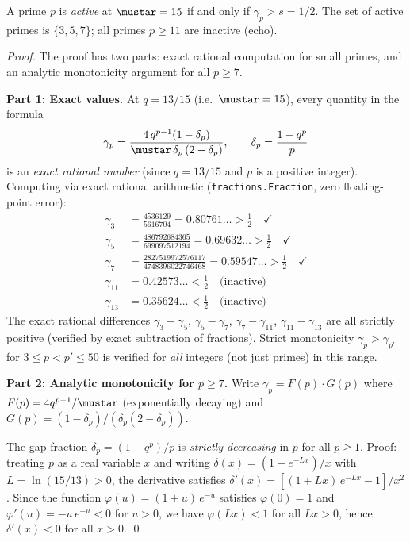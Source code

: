 \documentclass[12pt,a4paper]{article}
\begin{document}
\mTHM
\begin{theorem}
\label{thm:active}
A prime $p$ is \emph{active} at $\mustar = 15$ if and only if
$\gamma_p > s = 1/2$. The set of active primes is $\{3, 5, 7\}$;
all primes $p \geq 11$ are inactive (echo).

\begin{proof}
The proof has two parts: exact rational computation for small primes,
and an analytic monotonicity argument for all $p \geq 7$.

\medskip\noindent\textbf{Part 1: Exact values.}
At $q = 13/15$ (i.e.\ $\mustar = 15$), every quantity in the formula
\begin{equation}
  \gamma_p = \frac{4\,q^{p-1}(1 - \delta_p)}{\mustar\,\delta_p\,(2 - \delta_p)},
  \qquad \delta_p = \frac{1 - q^p}{p}
  \label{eq:gamma_explicit}
\end{equation}
is an \emph{exact rational number} (since $q = 13/15$ and $p$ is a positive
integer). Computing via exact rational arithmetic
(\texttt{fractions.Fraction}, zero floating-point error):
\begin{align*}
\gamma_3 &= \tfrac{4536129}{5616704} = 0.80761\ldots > \tfrac{1}{2} \quad \checkmark \\
\gamma_5 &= \tfrac{486792684365}{699097512194} = 0.69632\ldots > \tfrac{1}{2} \quad \checkmark \\
\gamma_7 &= \tfrac{2827519972576117}{4748396022746468} = 0.59547\ldots > \tfrac{1}{2} \quad \checkmark \\[3pt]
\gamma_{11} &= 0.42573\ldots < \tfrac{1}{2} \quad \text{(inactive)} \\
\gamma_{13} &= 0.35624\ldots < \tfrac{1}{2} \quad \text{(inactive)}
\end{align*}
The exact rational differences $\gamma_3 - \gamma_5$, $\gamma_5 - \gamma_7$,
$\gamma_7 - \gamma_{11}$, $\gamma_{11} - \gamma_{13}$ are all strictly
positive (verified by exact subtraction of fractions).
Strict monotonicity $\gamma_p > \gamma_{p'}$ for $3 \leq p < p' \leq 50$
is verified for \emph{all} integers (not just primes) in this range.

\medskip\noindent\textbf{Part 2: Analytic monotonicity for $p \geq 7$.}
Write $\gamma_p = F(p) \cdot G(p)$ where $F(p) = 4q^{p-1}/\mustar$
(exponentially decaying) and $G(p) = (1 - \delta_p)/(\delta_p(2-\delta_p))$.

The gap fraction $\delta_p = (1 - q^p)/p$ is \emph{strictly decreasing}
in $p$ for all $p \geq 1$. Proof: treating $p$ as a real variable $x$
and writing $\delta(x) = (1 - e^{-Lx})/x$ with $L = \ln(15/13) > 0$,
the derivative satisfies
$\delta'(x) = [(1 + Lx)\,e^{-Lx} - 1]/x^2$.
Since the function $\varphi(u) = (1+u)\,e^{-u}$ satisfies $\varphi(0) = 1$
and $\varphi'(u) = -u\,e^{-u} < 0$ for $u > 0$, we have $\varphi(Lx) < 1$
for all $Lx > 0$, hence $\delta'(x) < 0$ for all $x > 0$. \qed


\end{proof}
\end{theorem}
\end{document}
